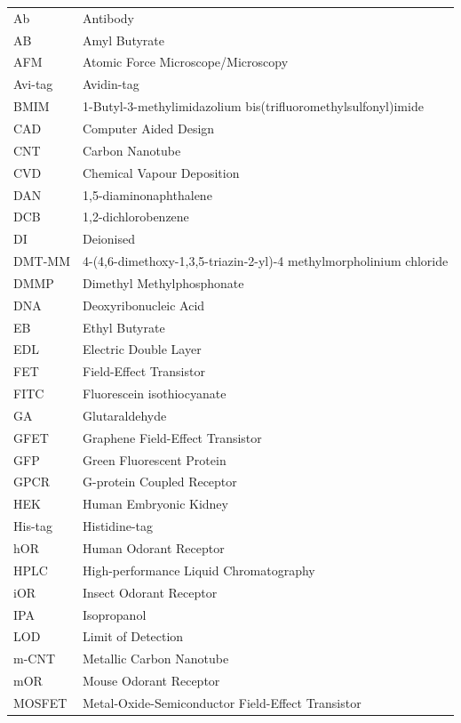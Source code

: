 \documentclass[
  a4paper,
]{scrbook}
\begin{document}
\begin{table}[h]
  \begin{tabular}{@{}p{} p{}@{}}  %
    Ab  & Antibody  \\
    AB  & Amyl Butyrate  \\
    AFM  & Atomic Force Microscope/Microscopy  \\
    Avi-tag  & Avidin-tag  \\
    BMIM  & 1-Butyl-3-methylimidazolium bis(trifluoromethylsulfonyl)imide  \\
    CAD  & Computer Aided Design \\
    CNT  & Carbon Nanotube  \\
    CVD  & Chemical Vapour Deposition  \\
    DAN  & 1,5-diaminonaphthalene  \\
    DCB  & 1,2-dichlorobenzene  \\
    DI  & Deionised  \\
    DMT-MM   & 4-(4,6-dimethoxy-1,3,5-triazin-2-yl)-4 methylmorpholinium chloride \\
    DMMP  & Dimethyl Methylphosphonate  \\
    DNA  & Deoxyribonucleic Acid  \\
    EB  & Ethyl Butyrate  \\
    EDL  & Electric Double Layer  \\
    FET  & Field-Effect Transistor  \\
    FITC  & Fluorescein isothiocyanate  \\
    GA  & Glutaraldehyde  \\
    GFET  & Graphene Field-Effect Transistor  \\
    GFP  & Green Fluorescent Protein  \\
    GPCR  & G-protein Coupled Receptor  \\
    HEK  & Human Embryonic Kidney  \\
    His-tag  & Histidine-tag  \\
    hOR  & Human Odorant Receptor  \\
    HPLC  & High-performance Liquid Chromatography   \\
    iOR  & Insect Odorant Receptor  \\
    IPA  & Isopropanol  \\
    LOD  & Limit of Detection  \\
    m-CNT  & Metallic Carbon Nanotube   \\
    mOR  & Mouse Odorant Receptor  \\
    MOSFET  & Metal-Oxide-Semiconductor Field-Effect Transistor  \\
  \end{tabular}
\end{table}
\end{document}
